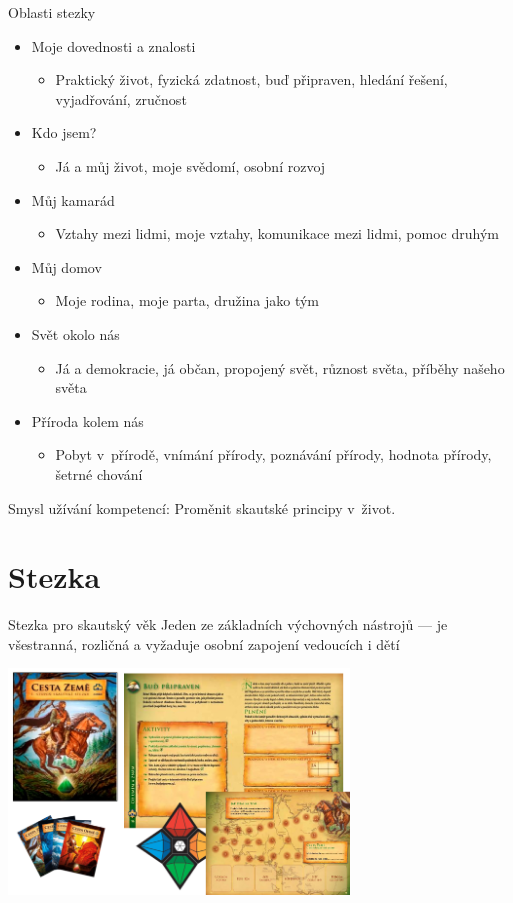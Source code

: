 \documentclass[compress,xelatex,xcolor=dvipsnames,hyperref={pdfpagelabels=false},print]{beamer}
\begin{document}
\begin{frame}{Oblasti stezky}
\begin{itemize}
\item Moje dovednosti a znalosti
 \begin{itemize}
 \item Praktický život, fyzická zdatnost, buď připraven, hledání řešení, vyjadřování, zručnost
 \end{itemize}
\item Kdo jsem?
 \begin{itemize}
 \item Já a můj život, moje svědomí, osobní rozvoj
 \end{itemize}
\item Můj kamarád
 \begin{itemize}
 \item Vztahy mezi lidmi, moje vztahy, komunikace mezi lidmi, pomoc druhým
 \end{itemize}
\item Můj domov
 \begin{itemize}
 \item Moje rodina, moje parta, družina jako tým
 \end{itemize}
\item Svět okolo nás
 \begin{itemize}
 \item Já a demokracie, já občan, propojený svět, různost světa, příběhy našeho světa
 \end{itemize}
\item Příroda kolem nás
 \begin{itemize}
 \item Pobyt v přírodě, vnímání přírody, poznávání přírody, hodnota přírody, šetrné chování
 \end{itemize}
\end{itemize}
Smysl užívání kompetencí: Proměnit skautské principy v~život.
\end{frame}

\section{Stezka}

\begin{frame}{Stezka pro skautský věk}
Jeden ze základních výchovných nástrojů --- je všestranná, rozličná a vyžaduje osobní zapojení vedoucích i dětí
\begin{center}
\includegraphics[height=6cm]{stezka.png}
\end{center}
\end{frame}
\end{document}
